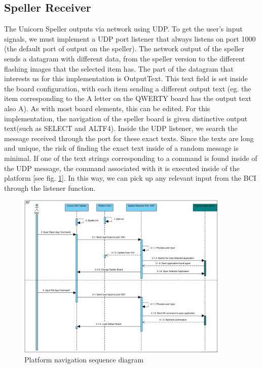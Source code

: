 \subsection{Speller Receiver}\label{subsect:Speller Receiver}
The Unicorn Speller outputs via network using UDP. To get the user's input signals, we must implement a UDP port listener that always listens on port 1000 (the default port of output on the speller). The network output of the speller sends a datagram with different data, from the speller version to the different flashing images that the selected item has. The part of the datagram that interests us for this implementation is OutputText. This text field is set inside the board configuration, with each item sending a different output text (eg. the item corresponding to the A letter on the QWERTY board has the output text also A). As with most board elements, this can be edited. For this implementation, the navigation of the speller board is given distinctive output text(such as SELECT and ALTF4). Inside the UDP listener, we search the message received through the port for these exact texts. Since the texts are long and unique, the risk of finding the exact text inside of a random message is minimal. If one of the text strings corresponding to a command is found inside of the UDP message, the command associated with it is executed inside of the platform [see fig. \ref{fig:platform navigation}]. In this way, we can pick up any relevant input from the BCI through the listener function.

\begin{figure}[H]
  \centering
  \includegraphics[width=0.9\textwidth]{Diagrams/Sequence/Platform - Nav.png}
  \caption{Platform navigation sequence diagram}
  \label{fig:platform navigation}
\end{figure}


